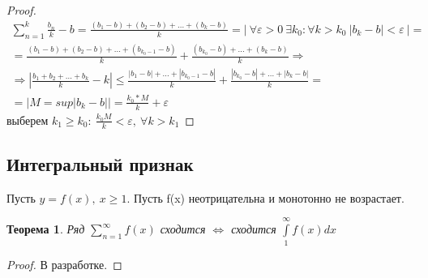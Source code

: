 \documentclass[12pt, oneside]{article}
\theoremstyle{plain}
\newtheorem{Theorem}{Теорема}
\begin{document}
	\begin{proof}
		\begin{multline}
			\sum_{n = 1}^{k}\frac{b_{n}}{k}- b = \frac{(b_{1} - b) + (b_{2} - b) + ...
			+ (b_{k} - b)}{k}=\bigg|\ \forall \varepsilon > 0 \ \exists k_{0}: \forall
			k > k_{0} \ |b_{k} - b|<\varepsilon \ \bigg|= \\
			= \frac{(b_{1} - b) + (b_{2} - b) + ... + (b_{k_0-1}- b)}{k}+ \frac{(b_{k_0}-
			b) + ... + (b_{k} - b)}{k}\Rightarrow \\
			\Rightarrow \left|\frac{b_{1} + b_{2} + ... + b_{k}}{k}- k \right| \leqslant
			\frac{|b_{1} - b| + ... + |b_{k_0-1}- b|}{k}+ \frac{|b_{k_0}- b| + ... + |b_{k}
			- b|}{k}\nonumber = \\
			=\bigg| M = sup|b_{k}-b| \bigg|= \frac{k_{0} * M}{k}+ \varepsilon
		\end{multline}
		выберем $k_{1} \geqslant k_{0}: \ \frac{k_{0} M}{k}< \varepsilon, \ \forall k
		> k_{1}$
	\end{proof}

	\subsection{Интегральный признак}
	Пусть $y = f(x), \ x \geqslant 1$. Пусть f(x) неотрицательна и монотонно не
	возрастает.
	\begin{Theorem}
		Ряд $\sum\limits_{n = 1}^{\infty}f(x)$ сходится $\Leftrightarrow$ сходится $\int
		\limits_{1}^{\infty}f(x)dx$
	\end{Theorem}
	\begin{proof}
		В разработке.

	\end{proof}
\end{document}
